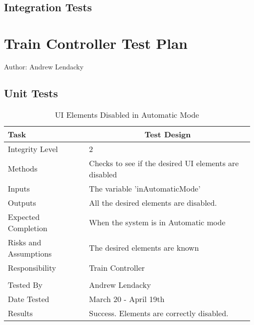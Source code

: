 \documentclass[]{article}
\begin{document}
\subsection{Integration Tests}

\section{Train Controller Test Plan}
Author: Andrew Lendacky
\subsection{Unit Tests}

\begin{table}[H]
	\centering
	\caption{UI Elements Disabled in Automatic Mode}
	\begin{tabular}{|l|l|}
		\hline
		Task & \multicolumn{1}{c|}{Test Design} \\ \hline
		Integrity Level & 2 \\ \hline
		Methods & Checks to see if the desired UI elements are disabled\\ \hline
		Inputs & The variable 'inAutomaticMode'\\ \hline
		Outputs & All the desired elements are disabled. \\ \hline
		Expected Completion & When the system is in Automatic mode\\ \hline
		Risks and Assumptions & The desired elements are known\\ \hline
		Responsibility & Train Controller\\ \hline
			\\ \hline
		Tested By   &  Andrew Lendacky\\	\hline
		Date Tested & \parbox[t]{10cm}{March 20 - April 19th}\\ \hline
		Results & Success. Elements are correctly disabled.\\ \hline
	\end{tabular}
\end{table}
\end{document}
